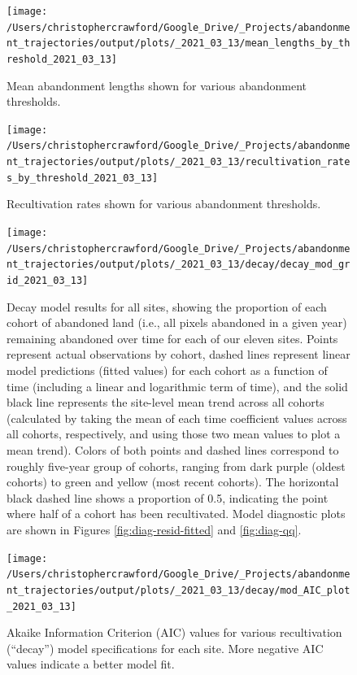 \documentclass[
]{article}
\begin{document}
\begin{figure}
\texttt{[image: /Users/christophercrawford/Google\_Drive/\_Projects/abandonment\_trajectories/output/plots/\_2021\_03\_13/mean\_lengths\_by\_threshold\_2021\_03\_13]} \caption{Mean abandonment lengths shown for various abandonment thresholds.}\label{fig:abn-thresholds-mean-duration}
\end{figure}



\begin{figure}
\texttt{[image: /Users/christophercrawford/Google\_Drive/\_Projects/abandonment\_trajectories/output/plots/\_2021\_03\_13/recultivation\_rates\_by\_threshold\_2021\_03\_13]} \caption{Recultivation rates shown for various abandonment thresholds.}\label{fig:recult-by-threshold}
\end{figure}



\begin{figure}
\texttt{[image: /Users/christophercrawford/Google\_Drive/\_Projects/abandonment\_trajectories/output/plots/\_2021\_03\_13/decay/decay\_mod\_grid\_2021\_03\_13]} \caption{Decay model results for all sites, showing the proportion of each cohort of abandoned land (i.e., all pixels abandoned in a given year) remaining abandoned over time for each of our eleven sites. Points represent actual observations by cohort, dashed lines represent linear model predictions (fitted values) for each cohort as a function of time (including a linear and logarithmic term of time), and the solid black line represents the site-level mean trend across all cohorts (calculated by taking the mean of each time coefficient values across all cohorts, respectively, and using those two mean values to plot a mean trend). Colors of both points and dashed lines correspond to roughly five-year group of cohorts, ranging from dark purple (oldest cohorts) to green and yellow (most recent cohorts). The horizontal black dashed line shows a proportion of 0.5, indicating the point where half of a cohort has been recultivated. Model diagnostic plots are shown in Figures \ref{fig:diag-resid-fitted} and \ref{fig:diag-qq}.}\label{fig:decay-model-grid}
\end{figure}



\begin{figure}
\texttt{[image: /Users/christophercrawford/Google\_Drive/\_Projects/abandonment\_trajectories/output/plots/\_2021\_03\_13/decay/mod\_AIC\_plot\_2021\_03\_13]} \caption{Akaike Information Criterion (AIC) values for various recultivation (``decay'') model specifications for each site. More negative AIC values indicate a better model fit.}\label{fig:AIC}
\end{figure}
\end{document}
